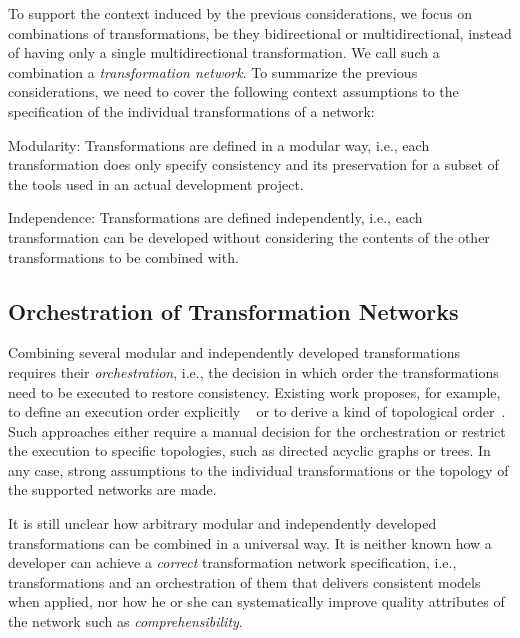 To support the context induced by the previous considerations, we focus on combinations of transformations, be they bidirectional or multidirectional, instead of having only a single multidirectional transformation.
We call such a combination a \emph{transformation network}.
To summarize the previous considerations, we need to cover the following context assumptions to the specification of the individual transformations of a network:
\begin{properdescription}
    \item[Modularity:] Transformations are defined in a modular way, i.e., each transformation does only specify consistency and its preservation for a subset of the tools used in an actual development project.
    \item[Independence:] Transformations are defined independently, i.e., each transformation can be developed without considering the contents of the other transformations to be combined with.
\end{properdescription}


\subsection{Orchestration of Transformation Networks}
\label{chap:introduction:consistency:orchestration}

Combining several modular and independently developed transformations requires their \emph{orchestration}, i.e., the decision in which order the transformations need to be executed to restore consistency.
Existing work proposes, for example, to define an execution order explicitly ~\cite{pilgrim2008a, vanhooff2007UniTI-MODELS} or to derive a kind of topological order~\cite{stevens2020BidirectionalTransformationLarge-SoSym}.
Such approaches either require a manual decision for the orchestration or restrict the execution to specific topologies, such as directed acyclic graphs or trees. %
In any case, strong assumptions to the individual transformations or the topology of the supported networks are made.

It is still unclear how arbitrary modular and independently developed transformations can be combined in a universal way.
It is neither known how a developer can achieve a \emph{correct} transformation network specification, i.e., transformations and an orchestration of them that delivers consistent models when applied, nor how he or she can systematically improve quality attributes of the network such as %
\emph{comprehensibility}.

